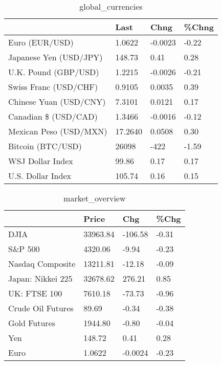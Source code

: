 \documentclass{article}%
\begin{document}
%


\begin{table}[htbp]%
\caption{global\_currencies}%
\centering%
\begin{adjustbox}{width=1\textwidth}%
\begin{tabular}{llll}
\toprule
                       &    Last &    Chng & \%Chng \\
\midrule
        Euro (EUR/USD) &  1.0622 & -0.0023 & -0.22 \\
Japanese Yen (USD/JPY) &  148.73 &    0.41 &  0.28 \\
  U.K. Pound (GBP/USD) &  1.2215 & -0.0026 & -0.21 \\
 Swiss Franc (USD/CHF) &  0.9105 &  0.0035 &  0.39 \\
Chinese Yuan (USD/CNY) &  7.3101 &  0.0121 &  0.17 \\
  Canadian \$ (USD/CAD) &  1.3466 & -0.0016 & -0.12 \\
Mexican Peso (USD/MXN) & 17.2640 &  0.0508 &  0.30 \\
     Bitcoin (BTC/USD) &   26098 &    -422 & -1.59 \\
      WSJ Dollar Index &   99.86 &    0.17 &  0.17 \\
     U.S. Dollar Index &  105.74 &    0.16 &  0.15 \\
\bottomrule
\end{tabular}
%
\end{adjustbox}%
\end{table}

%


\begin{table}[htbp]%
\caption{market\_overview}%
\centering%
\begin{adjustbox}{width=1\textwidth}%
\begin{tabular}{llll}
\toprule
                  &    Price &     Chg &  \%Chg \\
\midrule
             DJIA & 33963.84 & -106.58 & -0.31 \\
          S\&P 500 &  4320.06 &   -9.94 & -0.23 \\
 Nasdaq Composite & 13211.81 &  -12.18 & -0.09 \\
Japan: Nikkei 225 & 32678.62 &  276.21 &  0.85 \\
     UK: FTSE 100 &  7610.18 &  -73.73 & -0.96 \\
Crude Oil Futures &    89.69 &   -0.34 & -0.38 \\
     Gold Futures &  1944.80 &   -0.80 & -0.04 \\
              Yen &   148.72 &    0.41 &  0.28 \\
             Euro &   1.0622 & -0.0024 & -0.23 \\
\bottomrule
\end{tabular}
%
\end{adjustbox}%
\end{table}

%
\end{document}
